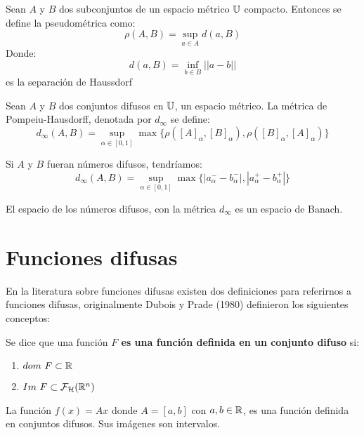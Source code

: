  \begin{definicion}[Pseudométrica]
    Sean $A$ y $B$ dos subconjuntos de un espacio métrico $\mathbb U$ compacto. Entonces se define la pseudométrica como:
    \[
    \rho(A, B) = \sup\limits_{a \in A} d(a, B)
    \]
    Donde:
    \[
    d(a, B) = \inf\limits_{b \in B} ||a-b||
    \]
    es la separación de Haussdorf
  \end{definicion}

  \begin{definicion}
    \label{def:metricadifusa}
    Sean $A$ y $B$ dos conjuntos difusos en $\mathbb U$, un espacio métrico. La métrica de Pompeiu-Hausdorff, denotada por $d_\infty$ se define:
    \[
    d_\infty(A, B) = \sup\limits_{\alpha \in [0, 1]} \max\{\rho([A]_\alpha, [B]_\alpha), \rho([B]_\alpha,  [A]_\alpha)\}
    \]
    
    Si $A$ y $B$ fueran números difusos, tendríamos:
    \[
    d_\infty(A, B) = \sup\limits_{\alpha \in [0, 1]} \max\{|a_\alpha^- - b_\alpha^-|, |a_\alpha^+ - b_\alpha^+|\}
    \]
  \end{definicion}

  \begin{teorema}
    \label{teorema:banach}
    El espacio de los números difusos, con la métrica $d_\infty$ es un espacio de Banach.
  \end{teorema}

  \section{Funciones difusas}
  En la literatura sobre funciones difusas existen dos definiciones para referirnos a funciones difusas, originalmente Dubois y Prade (1980) definieron los siguientes conceptos:

  \begin{definicion}
    \label{def:fizzusetvaluedfunc} Se dice que una función \textbf{$F$ es una función definida en un conjunto difuso} si:
    \begin{enumerate}
    \item $dom ~ F \subset \mathbb R$
    \item $Im ~ F \subset \mathcal{F}_\mathcal{H}(\mathbb R^n)$
    \end{enumerate}
  \end{definicion}

  \begin{ejemplo}
    La función $f(x) = A x$ donde $A=[a, b]$ con $a, b \in \mathbb R$, es una función definida en conjuntos difusos. Sus imágenes son intervalos.
  \end{ejemplo}

